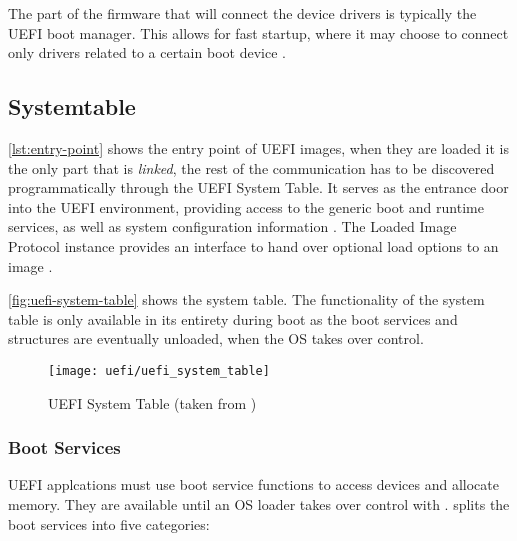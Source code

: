 The part of the firmware that will connect the device drivers is typically the \ac{UEFI} boot manager.
This allows for fast startup, where it may choose to connect only drivers related to a certain boot device \cite[Section 2.5.6]{uefi-spec}.

\subsection{Systemtable}



\autoref{lst:entry-point} shows the entry point of \ac{UEFI} images, when they are loaded it is the only part that is \emph{linked}, the rest of the communication has to be discovered programmatically through the \ac{UEFI} System Table.
It serves as the entrance door into the \ac{UEFI} environment, providing access to the generic boot and runtime services, as well as system configuration information \cite[Section 3.3]{tianocore-edk2-driver-writer-s-guide}.
The Loaded Image Protocol instance provides an interface to hand over optional load options to an image \cite{beyond-bios}.

\autoref{fig:uefi-system-table} shows the system table.
The functionality of the system table is only available in its entirety during boot as the boot services and structures are eventually unloaded, when the \ac{OS} takes over control.

\begin{figure}[htb]%
    \centering%
    \texttt{[image: uefi/uefi\_system\_table]}%
    \caption{\ac{UEFI} System Table (taken from \cite[Vol 2, Figure 2-5]{pi-spec})}%
    \label{fig:uefi-system-table}%
\end{figure}

\subsubsection{Boot Services}

\ac{UEFI} applcations must use boot service functions to access devices and allocate memory.
They are available until an \ac{OS} loader takes over control with .
\cite[Section 7]{uefi-spec} splits the boot services into five categories:

